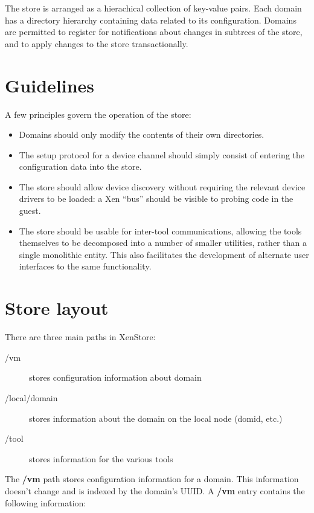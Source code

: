 \documentclass[11pt,twoside,final,openright]{report}
\begin{document}
The store is arranged as a hierachical collection of key-value pairs.
Each domain has a directory hierarchy containing data related to its
configuration.  Domains are permitted to register for notifications
about changes in subtrees of the store, and to apply changes to the
store transactionally.

\section{Guidelines}

A few principles govern the operation of the store:

\begin{itemize}
\item Domains should only modify the contents of their own
  directories.
\item The setup protocol for a device channel should simply consist of
  entering the configuration data into the store.
\item The store should allow device discovery without requiring the
  relevant device drivers to be loaded: a Xen ``bus'' should be
  visible to probing code in the guest.
\item The store should be usable for inter-tool communications,
  allowing the tools themselves to be decomposed into a number of
  smaller utilities, rather than a single monolithic entity.  This
  also facilitates the development of alternate user interfaces to the
  same functionality.
\end{itemize}

\section{Store layout}

There are three main paths in XenStore:

\begin{description}
\item[/vm] stores configuration information about domain
\item[/local/domain] stores information about the domain on the local node (domid, etc.)
\item[/tool] stores information for the various tools
\end{description}

The {\bf /vm} path stores configuration information for a domain.
This information doesn't change and is indexed by the domain's UUID.
A {\bf /vm} entry contains the following information:
\end{document}

